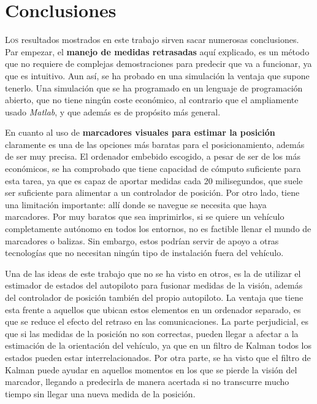 \chapter{Conclusiones} \label{chp-conclusiones}



\lettrine[lraise=-0.1, lines=2, loversize=0.2]{L}{os} resultados mostrados en este trabajo sirven sacar numerosas conclusiones. Par empezar, el \textbf{manejo de medidas retrasadas} aquí explicado, es un método que no requiere de complejas demostraciones para predecir que va a funcionar, ya que es intuitivo. Aun así, se ha probado en una simulación la ventaja que supone tenerlo. Una simulación que se ha programado en un lenguaje de programación abierto, que no tiene ningún coste económico, al contrario que el ampliamente usado \textit{Matlab}, y que además es de propósito más general. 



En cuanto al uso de \textbf{marcadores visuales para estimar la posición} claramente es una de las opciones más baratas para el posicionamiento, además de ser muy precisa. El ordenador embebido escogido, a pesar de ser de los más económicos, se ha comprobado que tiene capacidad de cómputo suficiente para esta tarea, ya que es capaz de aportar medidas cada 20 milisegundos, que suele ser suficiente para alimentar a un controlador de posición.
Por otro lado, tiene una limitación importante: allí donde se navegue se necesita que haya marcadores. Por muy baratos que sea imprimirlos, si se quiere un vehículo completamente autónomo en todos los entornos, no es factible llenar el mundo de marcadores o balizas.  
Sin embargo, estos podrían servir de apoyo a otras tecnologías que no necesitan ningún tipo de instalación fuera del vehículo. 

Una de las ideas de este trabajo que no se ha visto en otros, es la de utilizar el estimador de estados del autopiloto para fusionar medidas de la visión, además del controlador de posición también del propio autopiloto. La ventaja que tiene esta frente a aquellos que ubican estos elementos en un ordenador separado, es que se reduce el efecto del retraso en las comunicaciones. 
La parte perjudicial, es que si las medidas de la posición no son correctas, pueden llegar a afectar a la estimación de la orientación del vehículo, ya que en un filtro de Kalman todos los estados pueden estar interrelacionados. Por otra parte, se ha visto que el filtro de Kalman puede ayudar en aquellos momentos en los que se pierde la visión del marcador, llegando a predecirla de manera acertada si no transcurre mucho tiempo sin llegar una nueva medida de la posición. 


